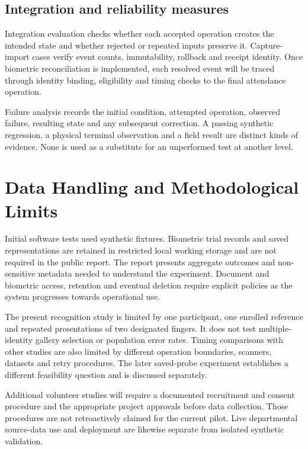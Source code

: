 \subsection{Integration and reliability measures}\label{sec:3-13-3}

Integration evaluation checks whether each accepted operation creates the intended state and whether rejected or repeated inputs preserve it. Capture-import cases verify event counts, immutability, rollback and receipt identity. Once biometric reconciliation is implemented, each resolved event will be traced through identity binding, eligibility and timing checks to the final attendance operation.




Failure analysis records the initial condition, attempted operation, observed failure, resulting state and any subsequent correction. A passing synthetic regression, a physical terminal observation and a field result are distinct kinds of evidence. None is used as a substitute for an unperformed test at another level.

\section{Data Handling and Methodological Limits}\label{sec:3-14}

Initial software tests used synthetic fixtures. Biometric trial records and saved representations are retained in restricted local working storage and are not required in the public report. The report presents aggregate outcomes and non-sensitive metadata needed to understand the experiment. Document and biometric access, retention and eventual deletion require explicit policies as the system progresses towards operational use.

The present recognition study is limited by one participant, one enrolled reference and repeated presentations of two designated fingers. It does not test multiple-identity gallery selection or population error rates. Timing comparisons with other studies are also limited by different operation boundaries, scanners, datasets and retry procedures. The later saved-probe experiment establishes a different feasibility question and is discussed separately.

Additional volunteer studies will require a documented recruitment and consent procedure and the appropriate project approvals before data collection. Those procedures are not retroactively claimed for the current pilot. Live departmental source-data use and deployment are likewise separate from isolated synthetic validation.

